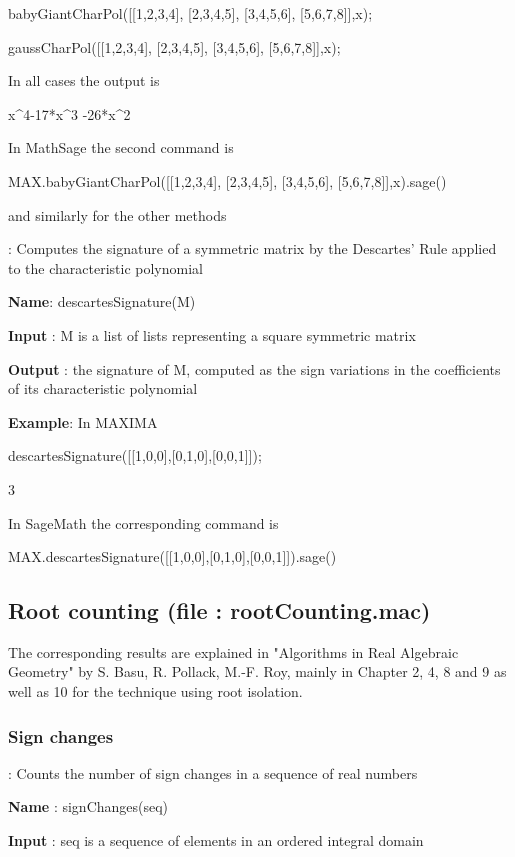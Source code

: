 \documentclass{article}
\begin{document}
babyGiantCharPol([[1,2,3,4], [2,3,4,5], [3,4,5,6], [5,6,7,8]],x);

gaussCharPol([[1,2,3,4], [2,3,4,5], [3,4,5,6], [5,6,7,8]],x);

In all cases the output is  
 
    x\^{}4-17*x\^{}3 -26*x\^{}2

\noindent In MathSage the second command is

MAX.babyGiantCharPol([[1,2,3,4], [2,3,4,5], [3,4,5,6], [5,6,7,8]],x).sage()

\noindent  and similarly for the other methods


:
  Computes the signature of a symmetric matrix by the Descartes' Rule applied to the characteristic polynomial
  
{\bf Name}: descartesSignature(M)
  
 {\bf  Input} : M is a list of lists representing a square symmetric matrix
  
{\bf Output} : the signature of M, computed as the sign variations in the coefficients of its characteristic polynomial
  
{\bf Example}: In MAXIMA

  descartesSignature([[1,0,0],[0,1,0],[0,0,1]]);
  
  3
  
  \noindent In SageMath the corresponding command is
  
  MAX.descartesSignature([[1,0,0],[0,1,0],[0,0,1]]).sage()
  

\subsection{Root counting (file : rootCounting.mac)}

The corresponding results are explained in "Algorithms in Real Algebraic
Geometry" by S. Basu, R. Pollack, M.-F. Roy, mainly in Chapter 2, 4, 8 and 9
as well as 10 for the technique using root isolation.

\subsubsection{Sign changes}

: Counts the number of sign changes in a sequence of real numbers
  
{\bf Name} : signChanges(seq)
  
{\bf  Input} : seq is a sequence of elements in an ordered integral domain
  
\end{document}
